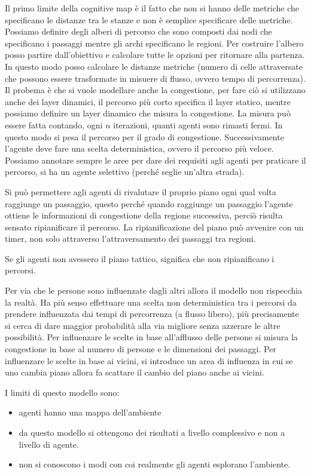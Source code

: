 Il primo limite della cognitive map è il fatto che non si hanno delle metriche 
che specificano le distanze tra le stanze e non è semplice specificare delle metriche.
Possiamo definire degli alberi di percorso che sono composti dai nodi che specificano
i passaggi mentre gli archi specificano le regioni. Per costruire l'albero posso 
partire dall'obiettivo e calcolare tutte le opzioni per ritornare alla partenza. 
In questo modo posso calcolare le distanze metriche (numero di celle 
attraversate che possono essere trasformate in misuere di flusso, ovvero tempo 
di percorrenza). Il probema è che si vuole modellare anche la congestione, 
per fare ciò si utilizzano anche dei layer dinamici, il percorso più corto specifica 
il layer statico, mentre possiamo definire un layer dinamico che misura la congestione.
La misura può essere fatta contando, ogni $n$ iterazioni, quanti agenti sono rimasti 
fermi. In questo modo si pesa il percorso per il grado di congestione. Successivamente 
l'agente deve fare una scelta deterministica, ovvero il percorso più veloce.
Possiamo annotare sempre le aree per dare dei requisiti agli agenti per praticare 
il percorso, si ha un agente selettivo (perché seglie un'altra strada). 

Si può permettere agli agenti di rivalutare il proprio piano ogni qual volta raggiunge
un passaggio, questo perché quando raggiunge un passaggio l'agente ottiene le informazioni
di congestione della regione successiva, perciò risulta sensato ripianificare 
il percorso. La ripianificazione del piano può avvenire con un timer, non solo 
attraverso l'attraversamento dei passaggi tra regioni.

\begin{nota}
    Se gli agenti non avessero il piano tattico, significa che non ripianificano
    i percorsi.
\end{nota}

Per via che le persone sono influenzate dagli altri allora il modello non rispecchia
la realtà. Ha più senso effettuare una scelta non deterministica tra i percorsi 
da prendere influenzata dai tempi di percorrenza (a flusso libero), più precisamente 
si cerca di dare maggior probabilità alla via migliore senza azzerare le altre possibilità.
Per influenzare le scelte in base all'afflusso delle persone si misura la congestione 
in base al numero di persone e le dimensioni dei passaggi.
Per influenzare le scelte in base ai vicini, si introduce un area di influenza 
in cui se uno cambia piano allora fa scattare il cambio del piano anche ai vicini.

I limiti di questo modello sono:
\begin{itemize}
    \item agenti hanno una mappa dell'ambiente
    \item da questo modello si ottengono dei risultati a livello complessivo e non 
    a livello di agente.
    \item non si conoscono i modi con coi realmente gli agenti esplorano l'ambiente.
\end{itemize}
